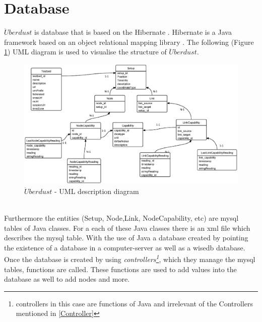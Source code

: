 \documentclass[12pt,a4paper]{report}
\begin{document}
\section{Database}
%
$\ddot{U}berdust$ is database that is based on the Hibernate \cite{website:hibernate}. Hibernate is a Java framework based on an object relational mapping library \cite{website:hibernate-wiki}. The following (Figure \ref{uberdust-uml}) UML diagram is used to visualise the structure of $\ddot{U}berdust$.
%
\begin{figure}[H]
\centering
\includegraphics*[scale=0.6]{wisedb2}
\caption{$\ddot{U}berdust$ - UML description diagram}
\label{uberdust-uml}
\end{figure}
\ \\
Furthermore the entities (Setup, Node,Link, NodeCapability, etc) are mysql tables of Java classes. For a each of these Java classes there is an xml file which describes the mysql table. With the use of Java a database created by pointing the existence of a database in a computer-server as well as a wisedb  database. Once the database is created by using \textit{controllers\footnote{controllers in this case are functions of Java and irrelevant of the Controllers mentioned in \ref{Controller}}}, which they manage the mysql tables, functions are called. These functions are used to add values into the database as well to add nodes and more. 
%
\newpage
%
\end{document}
